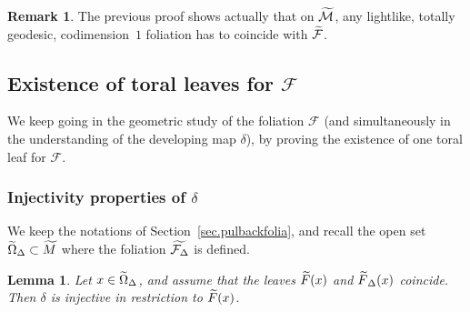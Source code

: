 \documentclass[11pt]{article}
\newtheorem{lemm}[theo]{Lemma}
\theoremstyle{definition}
\newtheorem{rema}[theo]{Remark}
\numberwithin{equation}{section}
\numberwithin{figure}{section}
\numberwithin{table}{section}
\newcommand{\calf}{\mathcal{F}}
\newcommand{\tcalm}{\tilde{\mathcal{M}}}
\newcommand{\tm}{\tilde{{M}}}
\newcommand{\tcalf}{\tilde{{\mathcal{F}}}}
\newcommand{\tFd}{\tilde{{F}}_{\Delta}}
\newcommand{\tF}{\tilde{{F}}}
\newcommand{\tcalfd}{\tilde{{\mathcal{F}_{\Delta}}}}
\let\oldtilde\tilde
\renewcommand*\tilde[1]{\mathchoice{\widetilde{#1}}{\widetilde{#1}}{\widetilde{#1}}{\oldtilde{#1}}}
\begin{document}
\begin{rema}\label{rem.codimension1}
The previous proof shows actually that on $\tcalm$, any lightlike, totally geodesic, codimension~$1$ foliation has to coincide with $\tcalf$.
\end{rema}


\subsection{Existence of toral leaves for \texorpdfstring{${\mathcal F}$}{F}}\label{sec.toral}
We keep going in the geometric study of the foliation $\calf$ (and simultaneously in the understanding of the developing map $\delta$), by proving the existence of one toral leaf for $\calf$.
\subsubsection{Injectivity properties of \texorpdfstring{$\delta$}{delta}}\label{sec.injectivity-leave}
We keep the notations of Section~\ref{sec.pulbackfolia}, and recall the open set $\tilde{\Omega}_{\Delta} \subset \tm$ where the foliation $\tcalfd$ is defined.
\begin{lemm}\label{lem.injective}
Let $x \in \tilde{\Omega}_{\Delta}$, and assume that the leaves $\tF(x)$ and $\tFd(x)$ coincide. Then $\delta$ is injective in restriction to $\tF(x)$.
\end{lemm}
\end{document}

